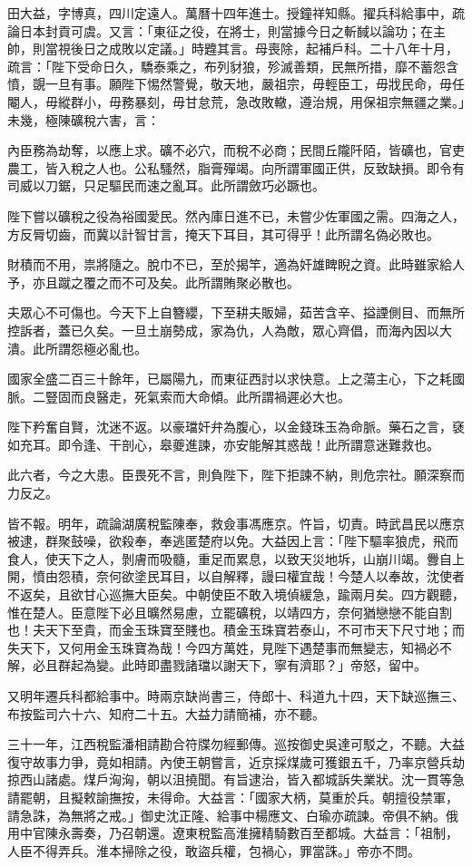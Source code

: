 \begin{pinyinscope}
田大益，字博真，四川定遠人。萬曆十四年進士。授鐘祥知縣。擢兵科給事中，疏論日本封貢可虞。又言：「東征之役，在將士，則當據今日之斬馘以論功；在主帥，則當視後日之成敗以定議。」時韙其言。母喪除，起補戶科。二十八年十月，疏言：「陛下受命日久，驕泰乘之，布列豺狼，殄滅善類，民無所措，靡不蓄怨含憤，覬一旦有事。願陛下惕然警覺，敬天地，嚴祖宗，毋輕臣工，毋戕民命，毋任閹人，毋縱群小，毋務暴刻，毋甘怠荒，急改敗轍，遵治規，用保祖宗無疆之業。」未幾，極陳礦稅六害，言：

內臣務為劫奪，以應上求。礦不必穴，而稅不必商；民間丘隴阡陌，皆礦也，官吏農工，皆入稅之人也。公私騷然，脂膏殫竭。向所謂軍國正供，反致缺損。即令有司威以刀鋸，只足驅民而速之亂耳。此所謂斂巧必蹶也。

陛下嘗以礦稅之役為裕國愛民。然內庫日進不已，未嘗少佐軍國之需。四海之人，方反脣切齒，而冀以計智甘言，掩天下耳目，其可得乎！此所謂名偽必敗也。

財積而不用，祟將隨之。脫巾不已，至於揭竿，適為奸雄睥睨之資。此時雖家給人予，亦且蹴之覆之而不可及矣。此所謂賄聚必散也。

夫眾心不可傷也。今天下上自簪纓，下至耕夫販婦，茹苦含辛、搤諲側目、而無所控訴者，蓋已久矣。一旦土崩勢成，家為仇，人為敵，眾心齊倡，而海內因以大潰。此所謂怨極必亂也。

國家全盛二百三十餘年，已屬陽九，而東征西討以求快意。上之蕩主心，下之耗國脈。二豎固而良醫走，死氣索而大命傾。此所謂禍遲必大也。

陛下矜奮自賢，沈迷不返。以豪璫奸弁為腹心，以金錢珠玉為命脈。藥石之言，褎如充耳。即令逢、干剖心，皋夔進諫，亦安能解其惑哉！此所謂意迷難救也。

此六者，今之大患。臣畏死不言，則負陛下，陛下拒諫不納，則危宗社。願深察而力反之。

皆不報。明年，疏論湖廣稅監陳奉，救僉事馮應京。忤旨，切責。時武昌民以應京被逮，群聚鼓噪，欲殺奉，奉逃匿楚府以免。大益因上言：「陛下驅率狼虎，飛而食人，使天下之人，剝膚而吸髓，重足而累息，以致天災地坼，山崩川竭。釁自上開，憤由怨積，奈何欲塗民耳目，以自解釋，謾曰權宜哉！今楚人以奉故，沈使者不返矣，且欲甘心巡撫大臣矣。中朝使臣不敢入境偵緩急，踰兩月矣。四方觀聽，惟在楚人。臣意陛下必且曠然易慮，立罷礦稅，以靖四方，奈何猶戀戀不能自割也！夫天下至貴，而金玉珠寶至賤也。積金玉珠寶若泰山，不可市天下尺寸地；而失天下，又何用金玉珠寶為哉！今四方萬姓，見陛下遇楚事而無變志，知禍必不解，必且群起為變。此時即盡戮諸璫以謝天下，寧有濟耶？」帝怒，留中。

又明年遷兵科都給事中。時兩京缺尚書三，侍郎十、科道九十四，天下缺巡撫三、布按監司六十六、知府二十五。大益力請簡補，亦不聽。

三十一年，江西稅監潘相請勘合符牒勿經郵傳。巡按御史吳達可駁之，不聽。大益復守故事力爭，竟如相請。內使王朝嘗言，近京採煤歲可獲銀五千，乃率京營兵劫掠西山諸處。煤戶洶洶，朝以沮撓聞。有旨逮治，皆入都城訴失業狀。沈一貫等急請罷朝，且擬敕諭撫按，未得命。大益言：「國家大柄，莫重於兵。朝擅役禁軍，請急誅，為無將之戒。」御史沈正隆、給事中楊應文、白瑜亦疏諫。帝俱不納。俄用中官陳永壽奏，乃召朝還。遼東稅監高淮擁精騎數百至都城。大益言：「祖制，人臣不得弄兵。淮本掃除之役，敢盜兵權，包禍心，罪當誅。」帝亦不問。


\end{pinyinscope}
